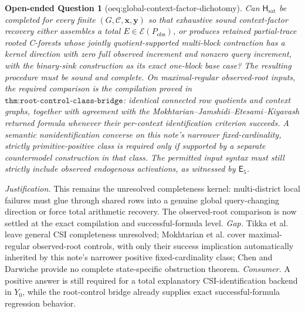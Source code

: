 \documentclass{article}
\newtheorem{openendedquestion}{Open-ended Question}
\begin{document}
\begin{openendedquestion}[oeq:global-context-factor-dichotomy]\label{oeq:global-context-factor-dichotomy}
Can \(\mathsf H_{\mathrm{sat}}\) be completed for every finite \((G,\mathcal C,\mathbf x,\mathbf y)\) so that exhaustive sound context-factor recovery either assembles a total \(E\in\mathscr E(P_{\mathrm{obs}})\), or produces retained partial-trace rooted C-forests whose jointly quotient-supported multi-block contraction has a kernel direction with zero full observed increment and nonzero query increment, with the binary-sink construction as its exact one-block base case? The resulting procedure must be sound and complete. On maximal-regular observed-root inputs, the required comparison is the compilation proved in \(\texttt{thm:root-control-class-bridge}\): identical connected row quotients and context graphs, together with agreement with the Mokhtarian--Jamshidi--Etesami--Kiyavash returned formula whenever their per-context identification criterion succeeds. A semantic nonidentification converse on this note's narrower fixed-cardinality, strictly primitive-positive class is required only if supported by a separate countermodel construction in that class. The permitted input syntax must still strictly include observed endogenous activations, as witnessed by \(\mathsf E_5\).
\end{openendedquestion}
\par\smallskip\noindent \textit{Justification.} This remains the unresolved completeness kernel: multi-district local failures must glue through shared rows into a genuine global query-changing direction or force total arithmetic recovery. The observed-root comparison is now settled at the exact compilation and successful-formula level. \textit{Gap.} Tikka et al. leave general CSI completeness unresolved; Mokhtarian et al. cover maximal-regular observed-root controls, with only their success implication automatically inherited by this note's narrower positive fixed-cardinality class; Chen and Darwiche provide no complete state-specific obstruction theorem. \textit{Consumer.} A positive answer is still required for a total explanatory CSI-identification backend in \(Y_0\), while the root-control bridge already supplies exact successful-formula regression behavior.
\end{document}
